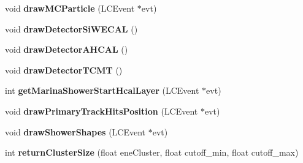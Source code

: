 \begin{DoxyCompactItemize}
\item 
void {\bfseries draw\-M\-C\-Particle} (L\-C\-Event $\ast$evt)\label{classCALICE_1_1EventDisplayProcessor_adcd63eabf525ce9235e4f1efffe7e4c3}

\item 
void {\bfseries draw\-Detector\-Si\-W\-E\-C\-A\-L} ()\label{classCALICE_1_1EventDisplayProcessor_aac49af6eceba5d02db9d405a42f229ec}

\item 
void {\bfseries draw\-Detector\-A\-H\-C\-A\-L} ()\label{classCALICE_1_1EventDisplayProcessor_acfdc0d075c062b1da8b297e0168405ca}

\item 
void {\bfseries draw\-Detector\-T\-C\-M\-T} ()\label{classCALICE_1_1EventDisplayProcessor_ad489bc345d421518f05340e2b7268365}

\item 
int {\bfseries get\-Marina\-Shower\-Start\-Hcal\-Layer} (L\-C\-Event $\ast$evt)\label{classCALICE_1_1EventDisplayProcessor_a087a520d52e265e7e46b59b8e226028b}

\item 
void {\bfseries draw\-Primary\-Track\-Hits\-Position} (L\-C\-Event $\ast$evt)\label{classCALICE_1_1EventDisplayProcessor_a938088e50170b4c44ea47a5e0e7d2710}

\item 
void {\bfseries draw\-Shower\-Shapes} (L\-C\-Event $\ast$evt)\label{classCALICE_1_1EventDisplayProcessor_a71e596ddf97ee37c2314b474a35eb15a}

\item 
int {\bf return\-Cluster\-Size} (float ene\-Cluster, float cutoff\-\_\-min, float cutoff\-\_\-max)
\end{DoxyCompactItemize}
